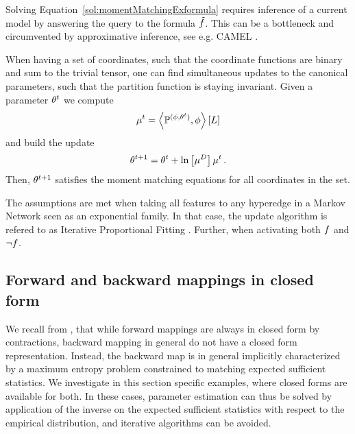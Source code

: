 Solving Equation~\ref{sol:momentMatchingExformula} requires inference of a current model by answering the query to the formula $\tilde{f}$.
This can be a bottleneck and circumvented by approximative inference, see e.g. CAMEL \cite{ganapathi_constrained_2008}.



\begin{remark}
	When having a set of coordinates, such that the coordinate functions are binary and sum to the trivial tensor, one can find simultaneous updates to the canonical parameters, such that the partition function is staying invariant.
	Given a parameter $\theta^t$ we compute
		\[ \mu^t = \left\langle \mathbb{P}^{(\phi,\theta^t)}, \phi\right\rangle \left[ L \right] \]
	and build the update
		\[ \theta^{t+1} = \theta^t + \ln \left[ \mu^{D} \right]{\mu^t} \, . \]
	Then, $\theta^{t+1}$ satisfies the moment matching equations for all coordinates in the set.
	
	
	The assumptions are met when taking all features to any hyperedge in a Markov Network seen as an exponential family.
	In that case, the update algorithm is refered to as  Iterative Proportional Fitting \cite{wainwright_graphical_2008}.
	Further, when activating both $f$ and $\lnot f$.
\end{remark}


\subsection{Forward and backward mappings in closed form}

We recall from , that while forward mappings are always in closed form by contractions, backward mapping in general do not have a closed form representation.
Instead, the backward map is in general implicitly characterized by a maximum entropy problem constrained to matching expected sufficient statistics.
We investigate in this section specific examples, where closed forms are available for both.
In these cases, parameter estimation can thus be solved by application of the inverse on the expected sufficient statistics with respect to the empirical distribution, and iterative algorithms can be avoided.


